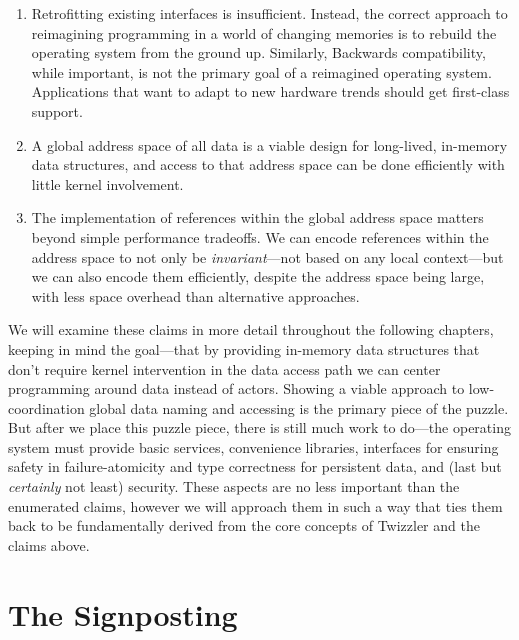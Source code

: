 \begin{enumerate}
    \item Retrofitting existing interfaces is insufficient. Instead, the correct approach to reimagining programming in
          a world of changing memories is to rebuild the operating system from the ground up.
          Similarly, Backwards compatibility, while important, is not the primary goal of a reimagined operating system.
          Applications that want to adapt to new hardware trends should get first-class support.
    \item A global address space of all data is a viable design for long-lived, in-memory data structures, and access to
          that address space can be done efficiently with little kernel involvement.
    \item The implementation of references within the global address space matters beyond simple performance tradeoffs.
          We can
          encode references within the address space to not only be \emph{invariant}---\ie not based on any local
          context---but we can also encode them efficiently, despite the address space being large, with less space
          overhead than alternative approaches.
\end{enumerate}

We will examine these claims in more detail throughout the following chapters, keeping in mind the goal---that by
providing in-memory data structures that don't require kernel intervention in the data access path we can center
programming around data instead of actors. Showing a viable approach to low-coordination global data naming and
accessing is the primary piece of the puzzle. But after we place this puzzle piece, there is still much work to do---the
operating system must provide basic services, convenience libraries, interfaces for ensuring safety in
failure-atomicity and type correctness for persistent data, and (last but \emph{certainly} not least)
security. These
aspects are no less important than the enumerated claims, however we will approach them in such a way that ties
them back to be fundamentally derived from the core concepts of Twizzler and the claims above.

\section*{The Signposting}

